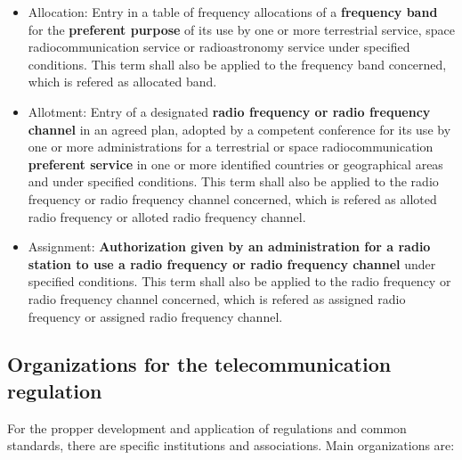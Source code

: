 \documentclass[
	12pt,
	twoside
]{book}
\begin{document}
\begin{itemize}
	\item Allocation: Entry in a table of frequency allocations of a \textbf{frequency band} for the \textbf{preferent purpose} of its use by one or more terrestrial service, space radiocommunication service or radioastronomy service under specified conditions. This term shall also be applied to the frequency band concerned, which is refered as allocated band.
	\item Allotment: Entry of a designated \textbf{radio frequency or radio frequency channel} in an agreed plan, adopted by a competent conference for its use by one or more administrations for a terrestrial or space radiocommunication \textbf{preferent service} in one or more identified countries or geographical areas and under specified conditions. This term shall also be applied to the radio frequency or radio frequency channel concerned, which is refered as alloted radio frequency or alloted radio frequency channel.
	\item Assignment: \textbf{Authorization given by an administration for a radio station to use a radio frequency or radio frequency channel} under specified conditions. This term shall also be applied to the radio frequency or radio frequency channel concerned, which is refered as assigned radio frequency or assigned radio frequency channel.
\end{itemize}

\subsection{Organizations for the telecommunication regulation}

For the propper development and application of regulations and common standards, there are specific institutions and associations. Main organizations are:
\end{document}
